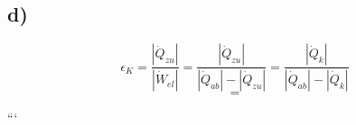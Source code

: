 

\subsection*{d)}
\[
\epsilon_K = \frac{|\dot{Q}_{zu}|}{|\dot{W}_{el}|} = \frac{|\dot{Q}_{zu}|}{|\dot{Q}_{ab}| - |\dot{Q}_{zu}|} = \frac{|\dot{Q}_{k}|}{|\dot{Q}_{ab}| - |\dot{Q}_{k}|}
\]
\[
=
\]

```
